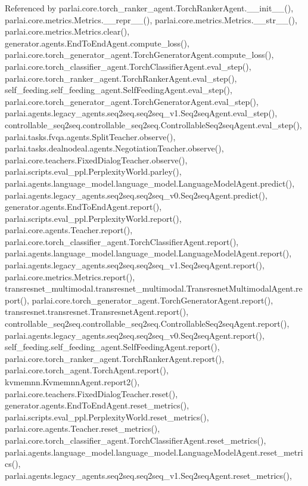 Referenced by parlai.\+core.\+torch\+\_\+ranker\+\_\+agent.\+Torch\+Ranker\+Agent.\+\_\+\+\_\+init\+\_\+\+\_\+(), parlai.\+core.\+metrics.\+Metrics.\+\_\+\+\_\+repr\+\_\+\+\_\+(), parlai.\+core.\+metrics.\+Metrics.\+\_\+\+\_\+str\+\_\+\+\_\+(), parlai.\+core.\+metrics.\+Metrics.\+clear(), generator.\+agents.\+End\+To\+End\+Agent.\+compute\+\_\+loss(), parlai.\+core.\+torch\+\_\+generator\+\_\+agent.\+Torch\+Generator\+Agent.\+compute\+\_\+loss(), parlai.\+core.\+torch\+\_\+classifier\+\_\+agent.\+Torch\+Classifier\+Agent.\+eval\+\_\+step(), parlai.\+core.\+torch\+\_\+ranker\+\_\+agent.\+Torch\+Ranker\+Agent.\+eval\+\_\+step(), self\+\_\+feeding.\+self\+\_\+feeding\+\_\+agent.\+Self\+Feeding\+Agent.\+eval\+\_\+step(), parlai.\+core.\+torch\+\_\+generator\+\_\+agent.\+Torch\+Generator\+Agent.\+eval\+\_\+step(), parlai.\+agents.\+legacy\+\_\+agents.\+seq2seq.\+seq2seq\+\_\+v1.\+Seq2seq\+Agent.\+eval\+\_\+step(), controllable\+\_\+seq2seq.\+controllable\+\_\+seq2seq.\+Controllable\+Seq2seq\+Agent.\+eval\+\_\+step(), parlai.\+tasks.\+fvqa.\+agents.\+Split\+Teacher.\+observe(), parlai.\+tasks.\+dealnodeal.\+agents.\+Negotiation\+Teacher.\+observe(), parlai.\+core.\+teachers.\+Fixed\+Dialog\+Teacher.\+observe(), parlai.\+scripts.\+eval\+\_\+ppl.\+Perplexity\+World.\+parley(), parlai.\+agents.\+language\+\_\+model.\+language\+\_\+model.\+Language\+Model\+Agent.\+predict(), parlai.\+agents.\+legacy\+\_\+agents.\+seq2seq.\+seq2seq\+\_\+v0.\+Seq2seq\+Agent.\+predict(), generator.\+agents.\+End\+To\+End\+Agent.\+report(), parlai.\+scripts.\+eval\+\_\+ppl.\+Perplexity\+World.\+report(), parlai.\+core.\+agents.\+Teacher.\+report(), parlai.\+core.\+torch\+\_\+classifier\+\_\+agent.\+Torch\+Classifier\+Agent.\+report(), parlai.\+agents.\+language\+\_\+model.\+language\+\_\+model.\+Language\+Model\+Agent.\+report(), parlai.\+agents.\+legacy\+\_\+agents.\+seq2seq.\+seq2seq\+\_\+v1.\+Seq2seq\+Agent.\+report(), parlai.\+core.\+metrics.\+Metrics.\+report(), transresnet\+\_\+multimodal.\+transresnet\+\_\+multimodal.\+Transresnet\+Multimodal\+Agent.\+report(), parlai.\+core.\+torch\+\_\+generator\+\_\+agent.\+Torch\+Generator\+Agent.\+report(), transresnet.\+transresnet.\+Transresnet\+Agent.\+report(), controllable\+\_\+seq2seq.\+controllable\+\_\+seq2seq.\+Controllable\+Seq2seq\+Agent.\+report(), parlai.\+agents.\+legacy\+\_\+agents.\+seq2seq.\+seq2seq\+\_\+v0.\+Seq2seq\+Agent.\+report(), self\+\_\+feeding.\+self\+\_\+feeding\+\_\+agent.\+Self\+Feeding\+Agent.\+report(), parlai.\+core.\+torch\+\_\+ranker\+\_\+agent.\+Torch\+Ranker\+Agent.\+report(), parlai.\+core.\+torch\+\_\+agent.\+Torch\+Agent.\+report(), kvmemnn.\+Kvmemnn\+Agent.\+report2(), parlai.\+core.\+teachers.\+Fixed\+Dialog\+Teacher.\+reset(), generator.\+agents.\+End\+To\+End\+Agent.\+reset\+\_\+metrics(), parlai.\+scripts.\+eval\+\_\+ppl.\+Perplexity\+World.\+reset\+\_\+metrics(), parlai.\+core.\+agents.\+Teacher.\+reset\+\_\+metrics(), parlai.\+core.\+torch\+\_\+classifier\+\_\+agent.\+Torch\+Classifier\+Agent.\+reset\+\_\+metrics(), parlai.\+agents.\+language\+\_\+model.\+language\+\_\+model.\+Language\+Model\+Agent.\+reset\+\_\+metrics(), parlai.\+agents.\+legacy\+\_\+agents.\+seq2seq.\+seq2seq\+\_\+v1.\+Seq2seq\+Agent.\+reset\+\_\+metrics(), 